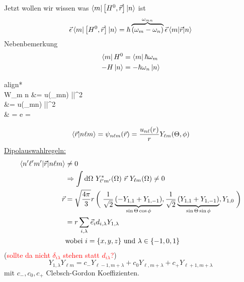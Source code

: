 	Jetzt wollen wir wissen was $\braket{m | \left[H^0 , \vec{r}\right] | n}$ ist
		\begin{align*}
			\vec{\epsilon} \braket{m | \left[H^0 , \vec{r}\right] | n} 
			= \hbar \overbrace{(\omega_m - \omega_n)}^{\mathclap{\omega_{mn}}} \vec{\epsilon} \braket{m | \vec{r} | n}
		\end{align*}
	Nebenbemerkung 
		\begin{align*}
			\bra{m} H^0 &= \bra{m} \hbar \omega_m \\
			-H \ket{n} &= -\hbar \omega_n \ket{n}
		\end{align*}
		\begin{empheq}[box=\boxed]{align*}
			 \\
					W_{m \rightarrow n} &=  u(\omega_{mn}) 
					\left|\right|^2\\
					&=  u(\omega_{mn}) 
					\left|\right|^2\\
					&  = e  =  \cdot {}
		\end{empheq}
		\begin{equation*}
			\braket{\vec{r} | n \ell m} = \psi_{n \ell m} (\vec{r}) 
			= \frac{u_{n \ell}(r)}{r} Y_{\ell m} (\Theta, \phi)
		\end{equation*}
	\underline{Dipolauswahlregeln:}
		\begin{align*}
			\braket{n' \ell' m' | \vec{r} | n \ell m} &\neq 0 \\
			&\Rightarrow \int \diff \Omega~Y^*_{\ell' m'}(\Omega)~\vec{r}~Y_{\ell m} (\Omega) \neq 0 \\
			\vec{r} &= \sqrt{\frac{4 \pi}{3}} r 
			\left( \vphantom{-\frac{1}{\sqrt{2}}} \right. 
				\frac{1}{\sqrt{2}} 
				\underbrace{(-Y_{1,1} + Y_{1,-1})}_{\mathclap{\sin \Theta \cos \phi}},
				\frac{1}{\sqrt{2}} \underbrace{(Y_{1,1} + Y_{1,-1})}_{\mathclap{\sin \Theta \sin \phi}},
				Y_{1,0}
			\left. \vphantom{-\frac{1}{\sqrt{2}}} \right) \\
			&= r \sum_{i,\lambda} \vec{e}_i d_{i,\lambda} Y_{1,\lambda} \\
			&\text{wobei~} i = \{x,y,z\} \text{~und~} \lambda \in \{-1,0,1\} 
		\end{align*}  
	(\textcolor{red}{sollte da nicht $\delta_{i \lambda}$ stehen statt $d_{i\lambda}$?})
		\begin{equation*}
			Y_{1,\lambda} Y_{\ell m} = c_- Y_{\ell - 1, m + \lambda}
			+ c_0 Y_{\ell, m+\lambda} + c_+ Y_{\ell + 1, m + \lambda}
		\end{equation*}
	mit $c_-,c_0, c_+$ Clebsch-Gordon Koeffizienten.
	
